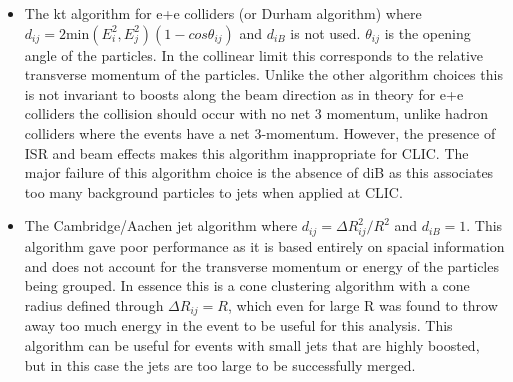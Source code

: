\begin{itemize}
\item The kt algorithm for e+e  colliders (or Durham algorithm) where $d_{ij} = 2\text{min}(E_{i}^{2}, E_{j}^{2})(1-cos\theta_{ij})$ and $d_{iB}$ is not used. $\theta_{ij}$ is the opening angle of the particles. In the collinear limit this corresponds to the relative transverse momentum of the particles. Unlike the other algorithm choices this is not invariant to boosts along the beam direction as in theory for e+e  colliders the collision should occur with no net 3 momentum, unlike hadron colliders where the events have a net 3-momentum. However, the presence of ISR and beam effects makes this algorithm inappropriate for CLIC. The major failure of this algorithm choice is the absence of diB as this associates too many background particles to jets when applied at CLIC.
\item The Cambridge/Aachen jet algorithm where $d_{ij} = {\Delta}R_{ij}^{2}/R^2$ and $d_{iB} = 1$. This algorithm gave poor performance as it is based entirely on spacial information and does not account for the transverse momentum or energy of the particles being grouped. In essence this is a cone clustering algorithm with a cone radius defined through ${\Delta}R_{ij} = R$, which even for large R was found to throw away too much energy in the event to be useful for this analysis. This algorithm can be useful for events with small jets that are highly boosted, but in this case the jets are too large to be successfully merged.
\end{itemize}

